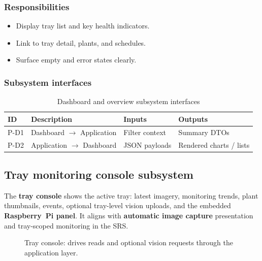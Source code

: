\subsubsection{Responsibilities}
\begin{itemize}
  \item Display tray list and key health indicators.
  \item Link to tray detail, plants, and schedules.
  \item Surface empty and error states clearly.
\end{itemize}

\subsubsection{Subsystem interfaces}
\begin{table}[H]
\centering
\small
\begin{tabular}{|p{0.9cm}|p{3.4cm}|p{3.0cm}|p{3.5cm}|}
\hline
\textbf{ID} & \textbf{Description} & \textbf{Inputs} & \textbf{Outputs} \\
\hline
P-D1 & Dashboard $\rightarrow$ Application & Filter context & Summary DTOs \\
\hline
P-D2 & Application $\rightarrow$ Dashboard & JSON payloads & Rendered charts / lists \\
\hline
\end{tabular}
\caption{Dashboard and overview subsystem interfaces}
\end{table}

\subsection{Tray monitoring console subsystem}

The \textbf{tray console} shows the active tray: latest imagery, monitoring trends, plant thumbnails, events, optional tray-level vision uploads, and the embedded \textbf{Raspberry~Pi panel}. It aligns with \textbf{automatic image capture} presentation and tray-scoped monitoring in the SRS.

\begin{figure}[H]
\centering
{}
\caption{Tray console: drives reads and optional vision requests through the application layer.}
\label{fig:pres-tray}
\end{figure}

